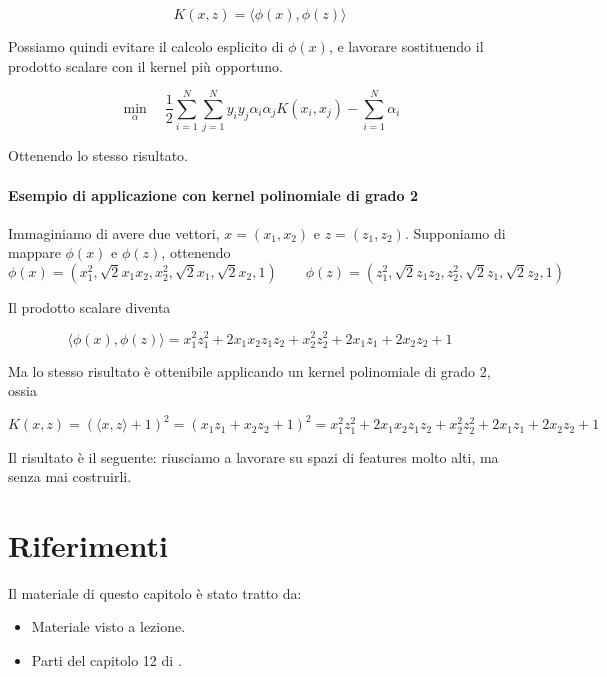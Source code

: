 $$K(x,z) = \langle \phi(x), \phi(z)\rangle$$

Possiamo quindi evitare il calcolo esplicito di $\phi(x)$, e lavorare sostituendo il prodotto scalare con il kernel più opportuno.

$$
\min_{\alpha} \quad
\frac{1}{2} \sum_{i=1}^{N} \sum_{j=1}^{N}
y_i y_j \alpha_i \alpha_j K(x_i,x_j)
- \sum_{i=1}^{N} \alpha_i 
$$

Ottenendo lo stesso risultato. 

\paragraph{Esempio di applicazione con kernel polinomiale di grado 2}

Immaginiamo di avere due vettori, $x = (x_1, x_2)$ e $z = (z_1, z_2)$.
Supponiamo di mappare $\phi(x)$ e $\phi(z)$, ottenendo
$$\phi(x) =
(
x_1^2,
\sqrt{2}x_1 x_2,
x_2^2,
\sqrt{2}x_1,
\sqrt{2}x_2,
1
) \qquad \phi(z) =
(
z_1^2,
\sqrt{2}z_1 z_2,
z_2^2,
\sqrt{2}z_1,
\sqrt{2}z_2,
1
)$$

\noindent
Il prodotto scalare diventa

$$\langle \phi(x), \phi(z)\rangle = x_1^2 z_1^2 + 2x_1 x_2 z_1 z_2 + x_2^2 z_2^2 + 2x_1 z_1 + 2x_2 z_2 + 1$$

\noindent
Ma lo stesso risultato è ottenibile applicando un kernel polinomiale di grado 2, ossia

$$K(x,z) = (\langle x,z\rangle + 1)^2 = (x_1 z_1 + x_2 z_2 + 1)^2 = x_1^2 z_1^2 + 2x_1 x_2 z_1 z_2 + x_2^2 z_2^2 + 2x_1 z_1 + 2x_2 z_2 + 1$$

Il risultato è il seguente: riusciamo a lavorare su spazi di features molto alti, ma senza mai costruirli. 

\section*{Riferimenti}
Il materiale di questo capitolo è stato tratto da:
\begin{itemize}
	\item Materiale visto a lezione.
	\item Parti del capitolo 12 di \cite{Deisenroth2020MML}.
\end{itemize}
